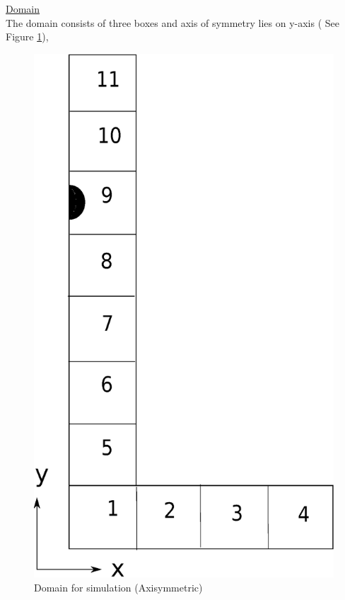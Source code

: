 \underline{Domain} \\
The domain consists of three boxes and axis of symmetry lies on y-axis ( See Figure \ref{Fig:domain-gerris}), 
\begin{figure}[tbp]
\centering
 \includegraphics[scale = 0.5]{domain.eps}
 \caption{Domain for simulation (Axisymmetric)}
 \label{Fig:domain-gerris}
\end{figure}


